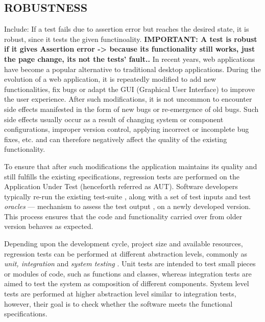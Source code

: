 \subsection*{ROBUSTNESS}
Include: If a test fails due to assertion error but reaches the desired state, it is robust, since it tests the given functinoality. 
\textbf{IMPORTANT: A test is robust if it gives Assertion error -> because its functionality still works, just the page change, its not the tests' fault.. }
\newpage
In recent years, web applications have become a popular alternative to traditional desktop applications.
During the evolution of a web application, it is repeatedly modified to add new functionalities, fix bugs or adapt the GUI (Graphical User Interface) to improve the user experience. After such modifications, it is not uncommon to encounter side effects manifested in the form of new bugs or re-emergence of old bugs. Such side effects usually occur as a result of changing system or component configurations, improper version control, applying incorrect or incomplete bug fixes, etc. and can therefore negatively affect the quality of the existing functionality. 

To ensure that after such modifications the application maintains its quality and still fulfills the existing specifications, regression tests are performed on the Application Under Test (henceforth referred as AUT). Software developers typically re-run the existing test-suite \cite{rothermel2001prioritizing}, \cite{elbaum2000prioritizing} along with a set of test inputs and test \textit{oracles} — mechanism to assess the test output \cite{1240304}, on a newly developed version. This process ensures that the code and functionality carried over from older version behaves as expected.

Depending upon the development cycle, project size and available resources, regression tests can be performed at different abstraction levels, commonly as \textit{unit, integration} and \textit{system testing} \cite{Mpezze}. Unit tests are intended to test small pieces or modules of code, such as functions and classes, whereas integration tests are aimed to test the system as composition of different components. System level tests are performed at higher abstraction level similar to integration tests, however, their goal is to check whether the software meets the functional specifications. 

